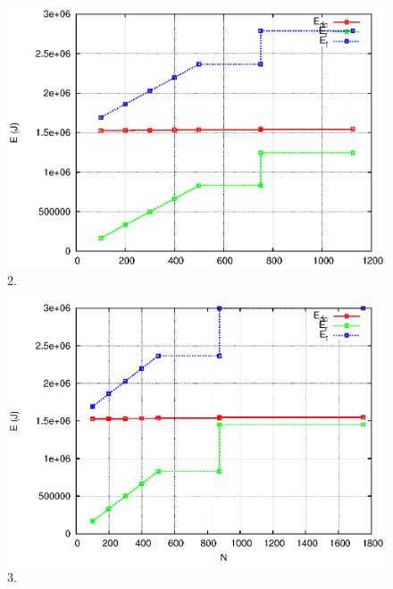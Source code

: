\documentclass[JIP]{ipsj}
\begin{document}
\begin{figure}[thb]
\begin{center}
\includegraphics[scale=0.6]{graphs/cdnp2p-2.eps}
\end{center}
\caption{2.}
\label{fig:4-2}
\vspace{-2mm}
\end{figure} 

\begin{figure}[thb]
\begin{center}
\includegraphics[scale=0.6]{graphs/cdnp2p-3.eps}
\end{center}
\caption{3.}
\label{fig:4-3}
\vspace{-2mm}
\end{figure} 
\end{document}
